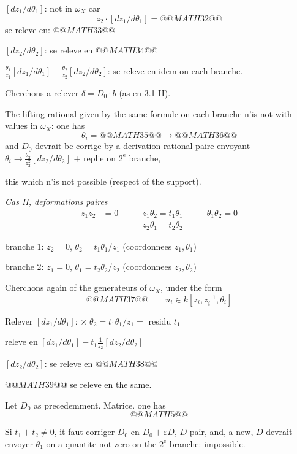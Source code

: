 \documentclass[11pt,a4paper]{article}
\theoremstyle{plain}
\theoremstyle{definition}
\begin{document}
$[dz_1/d\theta_1]$: not in $\omega_X$ car
\[
z_2 \cdot [dz_1/d\theta_1] = @@MATH32@@
\]
se releve en: $@@MATH33@@$

$[dz_2/d\theta_2]$: se releve en $@@MATH34@@$

$\frac{\theta_1}{z_1}[dz_1/d\theta_1] - \frac{\theta_2}{z_2}[dz_2/d\theta_2]$: se releve en idem on each branche.

\newpage

Cherchons a relever $\delta = D_0 \cdot \underline{b}$ (as en 3.1 II).

The lifting rational given by the same formule on each branche n'is not with values in $\omega_X$: one has
\[
\theta_i = @@MATH35@@ \longrightarrow @@MATH36@@
\]
and $D_0$ devrait be corrige by a derivation rational paire envoyant $\theta_i \to \frac{\theta_2}{z_2^2}[dz_2/d\theta_2]$ + replie on $2^{\text{e}}$ branche,

this which n'is not possible (respect of the support).

\medskip

\noindent \textit{Cas II, deformations paires}
\[
\begin{aligned}
z_1 z_2 &= 0 \qquad & z_1 \theta_2 = t_1 \theta_1 \qquad & \theta_1 \theta_2 = 0 \\
& & z_2 \theta_1 = t_2 \theta_2
\end{aligned}
\]

branche 1: $z_2 = 0$, $\theta_2 = t_1 \theta_1/z_1$ \hfill (coordonnees $z_1, \theta_1$)

branche 2: $z_1 = 0$, $\theta_1 = t_2 \theta_2/z_2$ \hfill (coordonnees $z_2, \theta_2$)

Cherchons again of the generateurs of $\omega_X$, under the form
\[
@@MATH37@@ \qquad u_i \in k[z_i, z_i^{-1}, \theta_i]
\]

Relever $[dz_1/d\theta_1]$: $\times \; \theta_2 = t_1 \theta_1/z_1 =$ residu $t_1$

releve en $[dz_1/d\theta_1] - t_1 \frac{1}{z_2} [dz_2/d\theta_2]$

$[dz_2/d\theta_2]$: se releve en $@@MATH38@@$

$@@MATH39@@$ se releve en the same.

\newpage

Let $D_0$ as precedemment. Matrice. one has
\[
@@MATH5@@
\]

Si $t_1 + t_2 \neq 0$, it faut corriger $D_0$ en $D_0 + \varepsilon D$, $D$ pair, and, a new, $D$ devrait envoyer $\theta_1$ on a quantite not zero on the $2^{\text{e}}$ branche: impossible.
\end{document}
